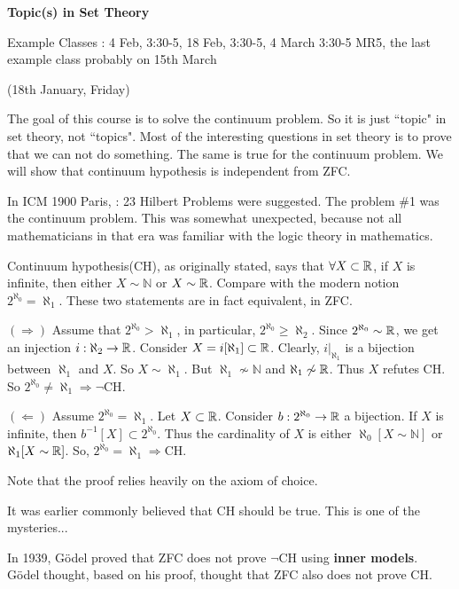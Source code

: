 \documentclass[12pt,a4paper]{article}
\newenvironment{proof}
{\begin{changemargin}{0.5cm}{0.5cm} 
	}%
	{\end{changemargin}
}
\newenvironment{p}
{\begin{proof} 
	}%
	{\end{proof}
}
\begin{document}
\setlength\parindent{0pt}
\s

\textbf{Topic(s) in Set Theory}

Example Classes : 4 Feb, 3:30-5, 18 Feb, 3:30-5, 4 March 3:30-5 MR5, the last example class probably on 15th March
\s

\newday

(18th January, Friday)
\s

The goal of this course is to solve the continuum problem. So it is just ``topic" in set theory, not ``topics". Most of the interesting questions in set theory is to prove that we can not do something. The same is true for the continuum problem. We will show that continuum hypothesis is independent from ZFC.
\s

In ICM 1900 Paris, : 23 Hilbert Problems were suggested. The problem \#1 was the continuum problem. This was somewhat unexpected, because not all mathematicians in that era was familiar with the logic theory in mathematics.
\s

Continuum hypothesis(CH), as originally stated, says that $\forall X\subset \mathbb{R}$, if $X$ is infinite, then either $X\sim \mathbb{N}$ or $X\sim \mathbb{R}$. Compare with the modern notion $2^{\aleph_0} = \aleph_1$. These two statements are in fact equivalent, in ZFC.
\begin{p}
$(\Rightarrow)$ Assume that $2^{\aleph_0} > \aleph_1$, in particular, $2^{\aleph_0} \geq \aleph_2$. Since $2^{\aleph_0}\sim \mathbb{R}$, we get an injection $i: \aleph_2 \rightarrow \mathbb{R}$. Consider $X = i[\aleph_1] \subset \mathbb{R}$. Clearly, $i|_{\aleph_1}$ is a bijection between $\aleph_1$ and $X$. So $X\sim \aleph_1$. But $\aleph_1 \not\sim \mathbb{N}$ and $\aleph_1 \not\sim \mathbb{R}$. Thus $X$ refutes CH. So $2^{\aleph_0} \neq \aleph_1 \Rightarrow \neg \text{CH}$.
\s

$(\Leftarrow)$ Assume $2^{\aleph_0} = \aleph_1$. Let $X\subset \mathbb{R}$. Consider $b: 2^{\aleph_0}\rightarrow \mathbb{R}$ a bijection. If $X$ is infinite, then $b^{-1} [X] \subset 2^{\aleph_0}$. Thus the cardinality of $X$ is either $\aleph_0[X\sim \mathbb{N}]$ or $\aleph_1[X\sim \mathbb{R}]$. So, $2^{\aleph_0}= \aleph_1 \Rightarrow \text{CH}$.
\end{p}
Note that the proof relies heavily on the axiom of choice.
\s

It was earlier commonly believed that CH should be true. This is one of the mysteries...
\s

In 1939, G\"{o}del proved that ZFC does not prove $\neg \text{CH}$ using \textbf{inner models}. G\"{o}del thought, based on his proof, thought that ZFC also does not prove CH. 
\end{document}
